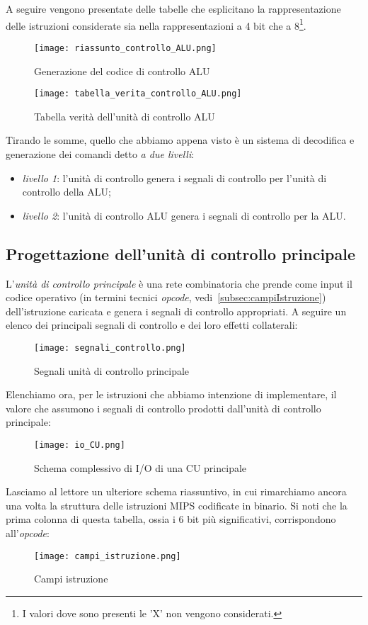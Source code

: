 A seguire vengono presentate delle tabelle che esplicitano la rappresentazione delle istruzioni considerate sia nella rappresentazioni a 4 bit che a 8\footnote{I valori dove sono presenti le 'X' non vengono considerati.}.

\begin{figure}[H]
	\centering
	\texttt{[image: riassunto\_controllo\_ALU.png]}
	\caption{Generazione del codice di controllo ALU}
\end{figure}

\begin{figure}[H]
	\centering
	\texttt{[image: tabella\_verita\_controllo\_ALU.png]}
	\caption{Tabella verità dell'unità di controllo ALU}
\end{figure}
Tirando le somme, quello che abbiamo appena visto è un sistema di decodifica e generazione dei comandi detto \emph{a due livelli}:
\begin{itemize}
	\item \emph{livello 1}: l'unità di controllo genera i segnali di controllo  per l'unità di controllo della ALU;
	\item \emph{livello 2}: l'unità di controllo ALU genera i segnali di controllo per la ALU.
\end{itemize}

\subsection{Progettazione dell'unità di controllo principale}
L'\emph{unità di controllo principale} è una rete combinatoria che prende come input il codice operativo (in termini tecnici \emph{opcode}, vedi~\ref{subsec:campiIstruzione}) dell'istruzione caricata e genera i segnali di controllo appropriati. A seguire un elenco dei principali segnali di controllo e dei loro effetti collaterali:

\begin{figure}[H]
	\centering
	\texttt{[image: segnali\_controllo.png]}
	\caption{Segnali unità di controllo principale}
\end{figure}
Elenchiamo ora, per le istruzioni che abbiamo intenzione di implementare, il valore che assumono i segnali di controllo prodotti dall'unità di controllo principale:

\begin{figure}[H]
	\centering
	\texttt{[image: io\_CU.png]}
	\caption{Schema complessivo di I/O di una CU principale}
\end{figure}
Lasciamo al lettore un ulteriore schema riassuntivo, in cui rimarchiamo ancora una volta la struttura delle istruzioni MIPS codificate in binario. Si noti che la prima colonna di questa tabella, ossia i 6 bit più significativi, corrispondono all'\emph{opcode}:
\begin{figure}[H]
	\centering
	\texttt{[image: campi\_istruzione.png]}
	\caption{Campi istruzione}
\end{figure}

